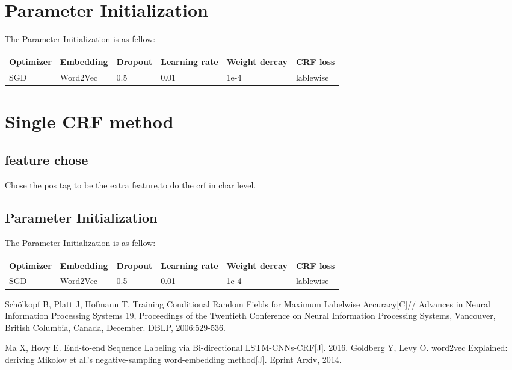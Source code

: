 \documentclass{llncs}
\begin{document}
\section{Parameter Initialization}
The Parameter Initialization is as fellow:
\begin{table}[!hbp]
	\begin{tabular}{|p{2cm}|p{2cm}|p{2cm}|p{2cm}|p{2cm}|p{2cm}|}
		\hline
		 Optimizer & Embedding & Dropout & Learning rate& Weight dercay&CRF loss \\
		\hline
		 SGD & Word2Vec & 0.5 & 0.01 & 1e-4 &lablewise\\
		\hline
	\end{tabular}
\end{table} 

\section{Single CRF method}
\subsection{feature chose}
Chose the pos tag to be the extra feature,to do the crf in char level.
\subsection{Parameter Initialization}
The Parameter Initialization is as fellow:
\begin{table}[!hbp]
	\begin{tabular}{|p{2cm}|p{2cm}|p{2cm}|p{2cm}|p{2cm}|p{2cm}|}
		\hline
		Optimizer & Embedding & Dropout & Learning rate& Weight dercay&CRF loss \\
		\hline
		SGD & Word2Vec & 0.5 & 0.01 & 1e-4 &lablewise\\
		\hline
	\end{tabular}
\end{table} 



%
%
\begin{thebibliography}{5}
%
Schölkopf B, Platt J, Hofmann T. Training Conditional Random Fields for Maximum Labelwise Accuracy[C]// Advances in Neural Information Processing Systems 19, Proceedings of the Twentieth Conference on Neural Information Processing Systems, Vancouver, British Columbia, Canada, December. DBLP, 2006:529-536.

Ma X, Hovy E. End-to-end Sequence Labeling via Bi-directional LSTM-CNNs-CRF[J]. 2016.
Goldberg Y, Levy O. word2vec Explained: deriving Mikolov et al.'s negative-sampling word-embedding method[J]. Eprint Arxiv, 2014.

\end{thebibliography}
\end{document}
